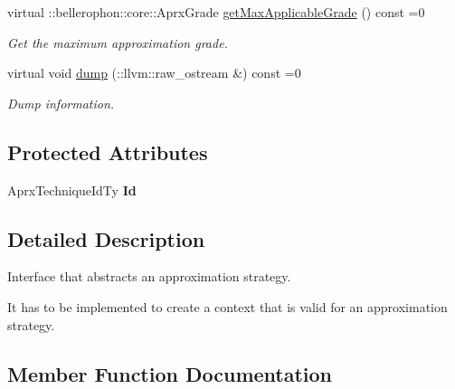 \begin{DoxyCompactItemize}
virtual \+::bellerophon\+::core\+::\+Aprx\+Grade \hyperlink{classbellerophon_1_1core_1_1AprxTechnique_a6bcebd487e19b535ee4097d21f7df5db}{get\+Max\+Applicable\+Grade} () const =0
\begin{DoxyCompactList}\small\item\em Get the maximum approximation grade. \end{DoxyCompactList}\item 
\hypertarget{classbellerophon_1_1core_1_1AprxTechnique_a715a29fa676a36b3a96fbce5dbe1806b}{}\label{classbellerophon_1_1core_1_1AprxTechnique_a715a29fa676a36b3a96fbce5dbe1806b} 
virtual void \hyperlink{classbellerophon_1_1core_1_1AprxTechnique_a715a29fa676a36b3a96fbce5dbe1806b}{dump} (\+::llvm\+::raw\+\_\+ostream \&) const =0
\begin{DoxyCompactList}\small\item\em Dump information. \end{DoxyCompactList}\end{DoxyCompactItemize}
\subsection*{Protected Attributes}
\begin{DoxyCompactItemize}
\item 
\hypertarget{classbellerophon_1_1core_1_1AprxTechnique_a87301666e78094fc18da8b719b3d5bca}{}\label{classbellerophon_1_1core_1_1AprxTechnique_a87301666e78094fc18da8b719b3d5bca} 
Aprx\+Technique\+Id\+Ty {\bfseries Id}
\end{DoxyCompactItemize}


\subsection{Detailed Description}
Interface that abstracts an approximation strategy. 

It has to be implemented to create a context that is valid for an approximation strategy. 

\subsection{Member Function Documentation}
\hypertarget{classbellerophon_1_1core_1_1AprxTechnique_a834c99b86f8f9cdd1f411c685b36a275}{}\label{classbellerophon_1_1core_1_1AprxTechnique_a834c99b86f8f9cdd1f411c685b36a275} 
